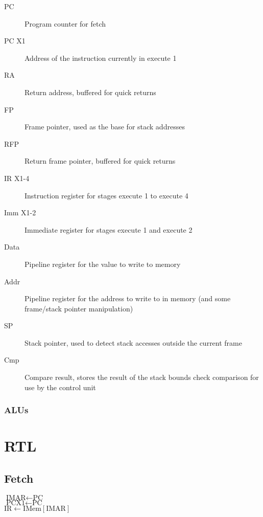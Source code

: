 \documentclass{report}
\begin{document}
			\begin{description}
				\item[PC] Program counter for fetch
				\item[PC X1] Address of the instruction currently in execute 1
				\item[RA] Return address, buffered for quick returns
				\item[FP] Frame pointer, used as the base for stack addresses
				\item[RFP] Return frame pointer, buffered for quick returns
				\item[IR X1-4] Instruction register for stages execute 1 to execute 4
				\item[Imm X1-2] Immediate register for stages execute 1 and execute 2
				\item[Data] Pipeline register for the value to write to memory
				\item[Addr] Pipeline register for the address to write to in memory (and some frame/stack pointer manipulation)
				\item[SP] Stack pointer, used to detect stack accesses outside the current frame
				\item[Cmp] Compare result, stores the result of the stack bounds check comparison for use by the control unit
			\end{description}

		\subsection{ALUs}

\chapter{RTL}

	\section{Fetch}
		\(\textrm{IMAR} \gets \textrm{PC}\) \\
		\(\textrm{PCX1} \gets \textrm{PC}\) \\
		\(\textrm{IR} \gets \textrm{IMem}[\textrm{IMAR}]\)
\end{document}
